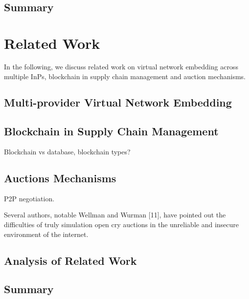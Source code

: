 \section{Summary}

\chapter{Related Work}
\label{ch:relatedwork}

In the following, we discuss related work on virtual network embedding across multiple InPs, blockchain in supply chain management and auction mechanisms.

\section{Multi-provider Virtual Network Embedding}

\section{Blockchain in Supply Chain Management}

Blockchain vs database, blockchain types?

\section{Auctions Mechanisms}

P2P negotiation.

Several authors, notable Wellman and Wurman [11], have pointed out the difficulties of truly simulation open cry auctions in the unreliable and insecure environment of the internet.


\section{Analysis of Related Work}



\section{Summary}

